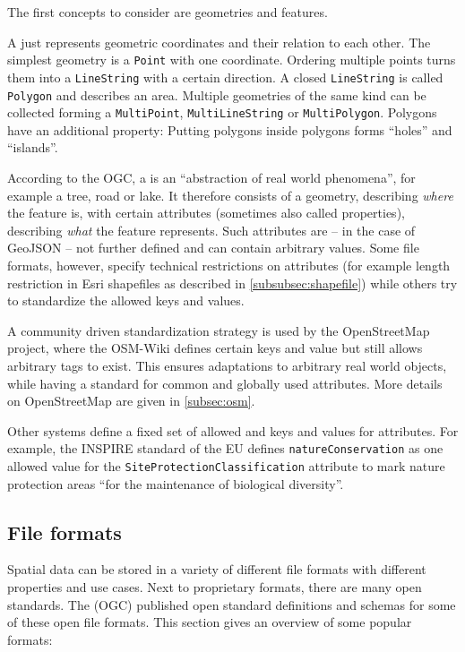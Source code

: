 		The first concepts to consider are geometries and features.
		
		A  just represents geometric coordinates and their relation to each other.
		The simplest geometry is a \texttt{Point} with one coordinate.
		Ordering multiple points turns them into a \texttt{LineString} with a certain direction.
		A closed \texttt{LineString} is called \texttt{Polygon} and describes an area.
		Multiple geometries of the same kind can be collected forming a \texttt{MultiPoint}, \texttt{MultiLineString} or \texttt{MultiPolygon}.
		Polygons have an additional property:
		Putting polygons inside polygons forms \enquote{holes} and \enquote{islands}.
		
		According to the OGC, a  is an \enquote{abstraction of real world phenomena}\cite[9]{ogc-sfa}, for example a tree, road or lake.
		It therefore consists of a geometry, describing \textit{where} the feature is, with certain attributes (sometimes also called properties), describing \textit{what} the feature represents.
		Such attributes are -- in the case of GeoJSON -- not further defined and can contain arbitrary values.
		Some file formats, however, specify technical restrictions on attributes (for example length restriction in Esri shapefiles as described in \cref{subsubsec:shapefile}) while others try to standardize the allowed keys and values.
		
		A community driven standardization strategy is used by the OpenStreetMap project, where the OSM-Wiki defines certain keys and value but still allows arbitrary tags to exist\cite{osm-wiki-proposal-process}.
		This ensures adaptations to arbitrary real world objects, while having a standard for common and globally used attributes.
		More details on OpenStreetMap are given in \cref{subsec:osm}.
		
		Other systems define a fixed set of allowed and keys and values for attributes.
		For example, the INSPIRE standard of the EU defines \texttt{natureConservation} as one allowed value for the \texttt{SiteProtectionClassification} attribute to mark nature protection areas \enquote{for the maintenance of biological diversity}\cite[31]{inspire-protected-sites}.
			
	\subsection{File formats}
	\label{subsec:file-formats}
	
		Spatial data can be stored in a variety of different file formats with different properties and use cases.
		Next to proprietary formats, there are many open standards.
		The  (OGC) published open standard definitions and schemas for some of these open file formats.		
		This section gives an overview of some popular formats:
		
